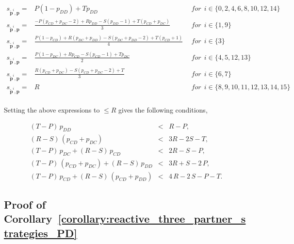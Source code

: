 \documentclass{article}
\theoremstyle{definition}
\begin{document}
\begin{equation*}
  \begin{array}{lcl}
  s_{\mathbf{\tilde{p}}^{i}, \mathbf{p}} = & P (1 - p_{DD}) + T p_{DD} & ~~for~~ i \in \{0, 2, 4, 6, 8, 10, 12, 14\} \\ [0.3cm]
  s_{\mathbf{\tilde{p}}^{i}, \mathbf{p}} = & \frac{-P(p_{CD} + p_{DC} - 2) + Rp_{DD} - S(p_{DD} - 1) + T(p_{CD} + p_{DC})}{3} & ~~for~~ i \in \{1, 9\} \\ [0.3cm]
  s_{\mathbf{\tilde{p}}^{i}, \mathbf{p}} = & \frac{P(1 - p_{CD}) + R(p_{DC} + p_{DD}) - S(p_{DC} + p_{DD} - 2) + T(p_{CD} + 1)}{4} & ~~for~~ i \in \{3\} \\ [0.3cm]
  s_{\mathbf{\tilde{p}}^{i}, \mathbf{p}} = & \frac{P(1 - p_{DC}) + Rp_{CD} - S(p_{CD} - 1) + Tp_{DC}}{2} & ~~for~~ i \in \{4, 5, 12, 13\} \\ [0.3cm]
  s_{\mathbf{\tilde{p}}^{i}, \mathbf{p}} = & \frac{R(p_{CD} + p_{DC}) - S(p_{CD} + p_{DC} - 2) + T}{3} & ~~for~~ i \in \{6, 7\} \\ [0.3cm]
  s_{\mathbf{\tilde{p}}^{i}, \mathbf{p}} = & R & ~~for~~ i \in \{8, 9, 10, 11, 12, 13, 14, 15\} \\ [0.3cm]
\end{array}
\end{equation*}

Setting the above expressions to $\leq R$ gives the following conditions,

\begin{equation*}
  \begin{array}{ccc}
    (T - P)\, p_{DD} & < & R - P, \\ [0.2cm]
    (R - S)\, (p_{CD} + p_{DC}) & < & 3 R - 2 S - T, \\ [0.2cm]
    (T - P)\, p_{DC}  + (R - S)\, p_{CD} & < & 2 R - S - P, \\ [0.2cm]
    (T - P)\, (p_{CD} + p_{DC}) + (R - S)\, p_{DD}  & < & 3 R + S - 2\,P, \\ [0.2cm]
    (T - P)\, p_{CD}  + (R - S)\, (p_{CD} + p_{DD}) & < & 4\,R - 2\,S - P - T.
\end{array}
\end{equation*}


\subsection{Proof of Corollary~\ref{corollary:reactive_three_partner_strategies_PD}}\label{appendix:reactive_three_pure_self_reactive_pd}
\end{document}
